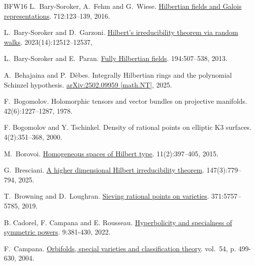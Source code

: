 \documentclass[10pt,a4paper]{amsart}
\theoremstyle{plain}
\theoremstyle{remark}
\numberwithin{theorem}{section}
\begin{document}
\begin{thebibliography}{BFW16}
L.~Bary-Soroker, A.~Fehm and G.~Wiese.
\newblock \href{https://doi.org/10.1515/crelle-2013-0116}{Hilbertian fields and Galois representations}.
 712:123--139, 2016.

L.~Bary-Soroker and D.~Garzoni.
\newblock \href{https://doi.org/10.1093/imrn/rnac188}{Hilbert’s irreducibility theorem via random walks}.
  2023(14):12512--12537, 

L.~Bary-Soroker and E.~Paran.
\newblock \href{https://doi.org/10.1007/s11856-012-0153-6}{Fully Hilbertian fields}.
 194:507--538, 2013.

A.~Behajaina and P.~D\`ebes.
\newblock 
Integrally Hilbertian rings and the polynomial Schinzel hypothesis.
\newblock \href{https://doi.org/10.48550/arXiv.2502.09959}{arXiv:2502.09959 [math.NT]}, 2025.

 F.~Bogomolov.
 \newblock Holomorphic tensors and vector bundles on projective manifolds.
    42(6):1227--1287, 1978.  

F. Bogomolov and Y. Tschinkel.
\newblock Density of rational points on elliptic K3 surfaces.
 4(2):351--368, 2000.

M.~Borovoi.
\newblock \href{https://doi.org/10.1142/S1793042115500207}{Homogeneous spaces of Hilbert type}.
 11(2):397--405, 2015.

G.~Bresciani.
\newblock \href{https://doi.org/10.1353/ajm.2025.a961346}{A higher dimensional Hilbert irreducibility theorem}.
147(3):779--794, 2025.

T.~Browning and D.~Loughran.
\newblock \href{https://doi.org/10.1090/tran/7514}{Sieving rational points on varieties}.
 371:5757--5785, 2019.

B. Cadorel, F. Campana and E. Rousseau.
\newblock \href{https://doi.org/10.5802/jep.185}{Hyperbolicity and specialness of symmetric powers}. 
 9:381-430, 2022.

F.~Campana.
\newblock \href{https://doi.org/10.5802/aif.2027}{Orbifolds, special varieties and classification theory}.
 vol.~54, p. 499-630, 2004.


\end{thebibliography}
\end{document}
